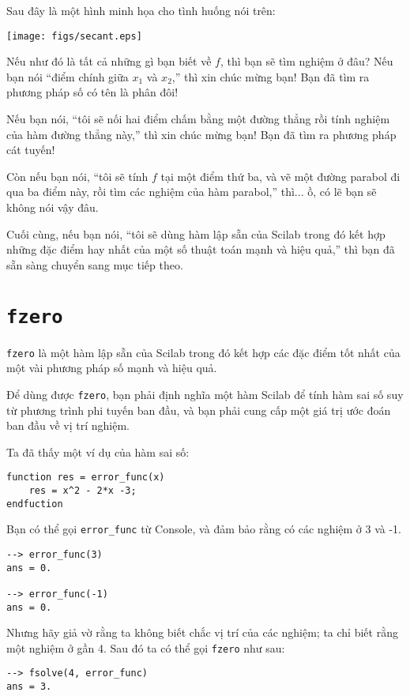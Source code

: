 \documentclass[12pt]{book}
\begin{document}
Sau đây là một hình minh họa cho tình huống nói trên:


\centerline{\texttt{[image: figs/secant.eps]}}

Nếu như đó là tất cả những gì bạn biết về $f$, thì bạn sẽ tìm
nghiệm ở đâu? Nếu bạn nói ``điểm chính giữa $x_1$ và $x_2$,''
thì xin chúc mừng bạn! Bạn đã tìm ra phương pháp số có tên là
phân đôi!

Nếu bạn nói, ``tôi sẽ nối hai điểm chấm bằng một đường thẳng rồi
tính nghiệm của hàm đường thẳng này,'' thì xin chúc mừng bạn! Bạn đã
tìm ra phương pháp cát tuyến!

Còn nếu bạn nói, ``tôi sẽ tính $f$ tại một điểm thứ ba, và vẽ một
đường parabol đi qua ba điểm này, rồi tìm các nghiệm của hàm
parabol,'' thì... ồ, có lẽ bạn sẽ không nói vậy đâu.

Cuối cùng, nếu bạn nói, ``tôi sẽ dùng hàm lập sẵn của Scilab trong đó
kết hợp những đặc điểm hay nhất của một số thuật toán mạnh và
hiệu quả,'' thì bạn đã sẵn sàng chuyển sang mục tiếp theo.


\section{{\tt fzero}}
\label{fzero}

{\tt fzero} là một hàm lập sẵn của Scilab trong đó kết hợp các
đặc điểm tốt nhất của một vài phương pháp số mạnh và hiệu quả.

Để dùng được {\tt fzero}, bạn phải định nghĩa một hàm Scilab 
để tính hàm sai số suy từ phương trình phi tuyến ban đầu, và bạn
phải cung cấp một giá trị ước đoán ban đầu về vị trí nghiệm.

Ta đã thấy một ví dụ của hàm sai số:

\begin{verbatim}
function res = error_func(x)
    res = x^2 - 2*x -3;
endfuction
\end{verbatim}

Bạn có thể gọi \verb#error_func# từ Console, và
đảm bảo rằng có các nghiệm ở  3 và -1.

\begin{verbatim}
--> error_func(3)
ans = 0.

--> error_func(-1)
ans = 0.
\end{verbatim}

Nhưng hãy giả vờ rằng ta không biết chắc vị trí của các nghiệm;
ta chỉ biết rằng một nghiệm ở gần 4.  Sau đó ta có thể gọi 
{\tt fzero} như sau:

\begin{verbatim}
--> fsolve(4, error_func)
ans = 3.
\end{verbatim}
\end{document}

